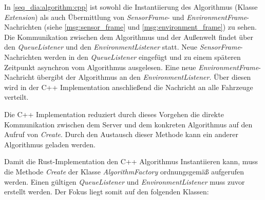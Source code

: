 In \autoref{seq_dia:algorithm:cpp} ist sowohl die Instantiierung des Algorithmus (Klasse \textit{Extension}) als auch Übermittlung von \textit{SensorFrame}- und \textit{EnvironmentFrame}-Nachrichten (siehe \autoref{msg:sensor_frame} und \autoref{msg:environment_frame}) zu sehen.
Die Kommunikation zwischen dem Algorithmus und der Außenwelt findet über den \textit{QueueListener} und den \textit{EnvironmentListener} statt.
Neue \textit{SensorFrame}-Nachrichten werden in den \textit{QueueListener} eingefügt und zu einem späteren Zeitpunkt asynchron vom Algorithmus ausgelesen.
Eine neue \textit{EnvironmentFrame}-Nachricht übergibt der Algorithmus an den \textit{EnvironmentListener}.
Über diesen wird in der C++ Implementation anschließend die Nachricht an alle Fahrzeuge verteilt.

Die C++ Implementation reduziert durch dieses Vorgehen die direkte Kommunikation zwischen dem Server und dem konkreten Algorithmus auf den Aufruf von \textit{Create}.
Durch den Austausch dieser Methode kann ein anderer Algorithmus geladen werden.

Damit die Rust-Implementation den C++ Algorithmus Instantiieren kann, muss die Methode \textit{Create} der Klasse \textit{AlgorithmFactory} ordnungsgemäß aufgerufen werden.
Einen gültigen \textit{QueueListener} und \textit{EnvironmentListener} muss zuvor erstellt werden.
Der Fokus liegt somit auf den folgenden Klassen:

